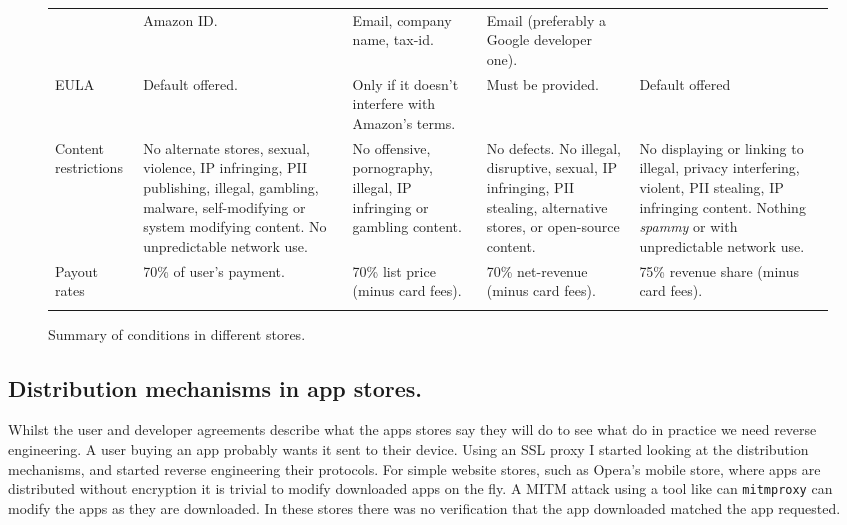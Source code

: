 \documentclass[a4paper]{scrartcl}
\begin{document}
\begin{figure}[!h]
\begin{tabulary}{\linewidth}{lLLLL}
                     & Amazon ID.
                     & Email, company name, tax-id.
                     & Email (preferably a Google developer one).                                                                                                                        \\ \addlinespace
EULA                 & Default offered.
                     & Only if it doesn't interfere with Amazon's terms.
                     & Must be provided.
                     & Default offered                                                                                                                                                   \\ \addlinespace
Content restrictions & No alternate stores, sexual, violence, IP infringing, PII publishing, illegal, gambling, malware, self-modifying or system modifying content.  No unpredictable network use.
                     & No offensive, pornography, illegal, IP infringing or gambling content.
                     & No defects. No illegal, disruptive, sexual, IP infringing, PII stealing, alternative stores, or open-source content.
                     & No displaying or linking to illegal, privacy interfering, violent, PII stealing, IP infringing content.  Nothing \emph{spammy} or with unpredictable network use. \\ \addlinespace
Payout rates         & 70\% of user's payment.
                     & 70\% list price (minus card fees).
                     & 70\% net-revenue (minus card fees).
                     & 75\% revenue share (minus card fees).                                                                                                                             \\ \addlinespace
\bottomrule
\end{tabulary}
\caption{Summary of conditions in different stores.}
\label{tab:terms}
\end{figure}

\subsection{Distribution mechanisms in app stores.}

Whilst the user and developer agreements describe what the apps stores say they will do to see what do in practice we need reverse engineering.
A user buying an app probably wants it sent to their device.
Using an SSL proxy I started looking at the distribution mechanisms, and started reverse engineering their protocols.
For simple website stores, such as Opera's mobile store, where apps are distributed without encryption it is trivial to modify downloaded apps on the fly.
A \ac{MITM} attack using a tool like can \texttt{mitmproxy} can modify the apps as they are downloaded.
In these stores there was no verification that the app downloaded matched the app requested.
\end{document}
